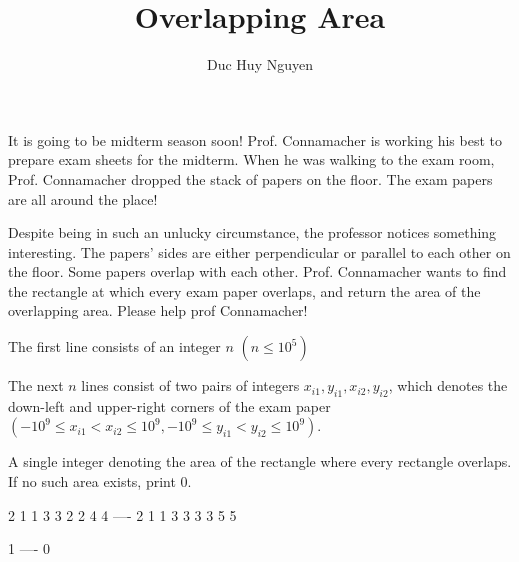 \documentclass{article}
\title{Overlapping Area}
\author{Duc Huy Nguyen}
\begin{document}
\begin{problemDescription}

It is going to be midterm season soon! Prof. Connamacher is working his best to prepare exam sheets for the midterm. When he was walking to the exam room, Prof. Connamacher dropped the stack of papers on the floor. The exam papers are all around the place!

Despite being in such an unlucky circumstance, the professor notices something interesting. The papers’ sides are either perpendicular or parallel to each other on the floor. Some papers overlap with each other. Prof. Connamacher wants to find the rectangle at which every exam paper overlaps, and return the area of the overlapping area. Please help prof Connamacher!


\end{problemDescription}

\begin{inputDescription}
    The first line consists of an integer $n$ $(n \leq 10^5)$

The next $n$ lines consist of two pairs of integers $x_{i1}, y_{i1}, x_{i2}, y_{i2}$, which denotes the down-left and upper-right corners of the exam paper $(-10^9 \leq x_{i1} < x_{i2} \leq 10^9, -10^9 \leq y_{i1} < y_{i2} \leq 10^9)$.

\end{inputDescription}

\begin{outputDescription}
    A single integer denoting the area of the rectangle where every rectangle overlaps. If no such area exists, print $0$.
\end{outputDescription}

\begin{sampleInput}
2
1 1 3 3
2 2 4 4
----
2
1 1 3 3
3 3 5 5
\end{sampleInput}
\begin{sampleOutput}
1
----
0
\end{sampleOutput}
\end{document}
